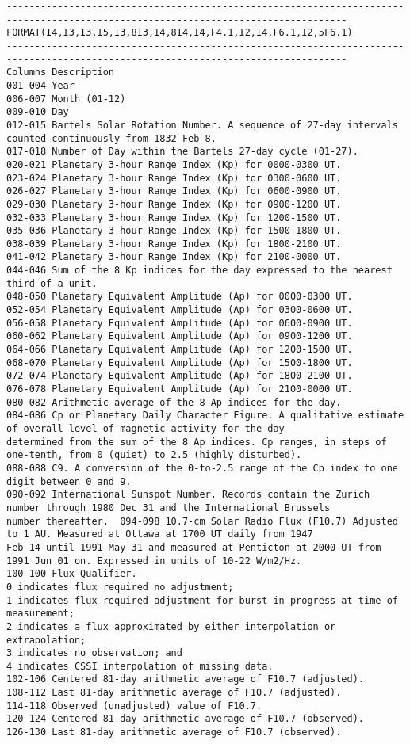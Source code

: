 \begin{landscape}
\begin{small}
\begin{verbatim}----------------------------------------------------------------------------------------------------------------------------------
FORMAT(I4,I3,I3,I5,I3,8I3,I4,8I4,I4,F4.1,I2,I4,F6.1,I2,5F6.1)
----------------------------------------------------------------------------------------------------------------------------------
Columns	Description
001-004	Year
006-007	Month (01-12)
009-010	Day
012-015	Bartels Solar Rotation Number. A sequence of 27-day intervals counted continuously from 1832 Feb 8.
017-018	Number of Day within the Bartels 27-day cycle (01-27).
020-021	Planetary 3-hour Range Index (Kp) for 0000-0300 UT.
023-024	Planetary 3-hour Range Index (Kp) for 0300-0600 UT.
026-027	Planetary 3-hour Range Index (Kp) for 0600-0900 UT.
029-030	Planetary 3-hour Range Index (Kp) for 0900-1200 UT.
032-033	Planetary 3-hour Range Index (Kp) for 1200-1500 UT.
035-036	Planetary 3-hour Range Index (Kp) for 1500-1800 UT.
038-039	Planetary 3-hour Range Index (Kp) for 1800-2100 UT.
041-042	Planetary 3-hour Range Index (Kp) for 2100-0000 UT.
044-046	Sum of the 8 Kp indices for the day expressed to the nearest third of a unit.
048-050	Planetary Equivalent Amplitude (Ap) for 0000-0300 UT.
052-054	Planetary Equivalent Amplitude (Ap) for 0300-0600 UT.
056-058	Planetary Equivalent Amplitude (Ap) for 0600-0900 UT.
060-062	Planetary Equivalent Amplitude (Ap) for 0900-1200 UT.
064-066	Planetary Equivalent Amplitude (Ap) for 1200-1500 UT.
068-070	Planetary Equivalent Amplitude (Ap) for 1500-1800 UT.
072-074	Planetary Equivalent Amplitude (Ap) for 1800-2100 UT.
076-078	Planetary Equivalent Amplitude (Ap) for 2100-0000 UT.
080-082	Arithmetic average of the 8 Ap indices for the day.
084-086	Cp or Planetary Daily Character Figure. A qualitative estimate of overall level of magnetic activity for the day
determined from the sum of the 8 Ap indices. Cp ranges, in steps of one-tenth, from 0 (quiet) to 2.5 (highly disturbed).
088-088	C9. A conversion of the 0-to-2.5 range of the Cp index to one digit between 0 and 9.
090-092	International Sunspot Number. Records contain the Zurich number through 1980 Dec 31 and the International Brussels
number thereafter.  094-098	10.7-cm Solar Radio Flux (F10.7) Adjusted to 1 AU. Measured at Ottawa at 1700 UT daily from 1947
Feb 14 until 1991 May 31 and measured at Penticton at 2000 UT from 1991 Jun 01 on. Expressed in units of 10-22 W/m2/Hz.
100-100	Flux Qualifier.
0 indicates flux required no adjustment;
1 indicates flux required adjustment for burst in progress at time of measurement;
2 indicates a flux approximated by either interpolation or extrapolation;
3 indicates no observation; and
4 indicates CSSI interpolation of missing data.
102-106	Centered 81-day arithmetic average of F10.7 (adjusted).
108-112	Last 81-day arithmetic average of F10.7 (adjusted).
114-118	Observed (unadjusted) value of F10.7.
120-124	Centered 81-day arithmetic average of F10.7 (observed).
126-130	Last 81-day arithmetic average of F10.7 (observed).
\end{verbatim}
\end{small}
\end{landscape}
